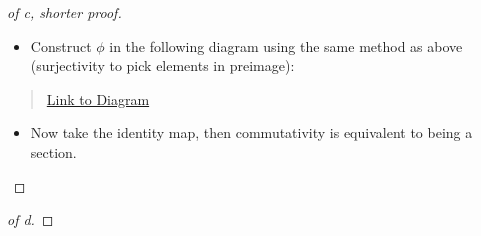 \begin{solution}
\begin{proof}[of c, shorter proof]
\begin{itemize}
  \begin{itemize}
  \tightlist
  \item
    Construct \(\phi\) in the following diagram using the same method as
    above (surjectivity to pick elements in preimage):
  \end{itemize}
\end{itemize}

\begin{center}
\end{center}

\begin{quote}
\href{https://q.uiver.app/?q=WzAsNSxbMCw0LCJNIl0sWzIsNCwiTiJdLFs0LDQsIjAiXSxbMiwyLCJGIl0sWzIsMCwiWCJdLFs0LDMsIlxcaW90YSIsMCx7InN0eWxlIjp7InRhaWwiOnsibmFtZSI6Imhvb2siLCJzaWRlIjoidG9wIn19fV0sWzMsMSwiZiJdLFswLDEsIlxccGkiLDIseyJzdHlsZSI6eyJoZWFkIjp7Im5hbWUiOiJlcGkifX19XSxbMSwyXSxbMywwLCJcXGV4aXN0cyBcXHRpbGRlIFxccGhpIiwyLHsic3R5bGUiOnsiYm9keSI6eyJuYW1lIjoiZGFzaGVkIn19fV0sWzQsMCwiXFxwaGkiLDIseyJjdXJ2ZSI6NH1dXQ==}{Link
to Diagram}
\end{quote}

\begin{itemize}
\tightlist
\item
  Now take the identity map, then commutativity is equivalent to being a
  section.
\end{itemize}

\begin{center}
\end{center}

\end{proof}

\begin{proof}[of d]


\end{proof}
\end{solution}
